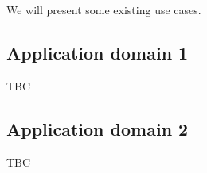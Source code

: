 
We will present some existing use cases. 


\subsection{Application domain 1}  TBC
\subsection{Application domain 2}  TBC